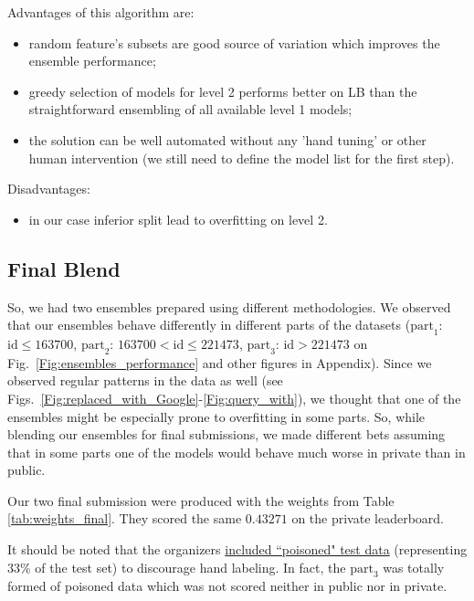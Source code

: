 \documentclass[12pt]{article}
\begin{document}
Advantages of this algorithm are:
\begin{itemize}
\item random feature's subsets are good source of variation which improves the ensemble performance;
\item greedy selection of models for level 2 performs better on LB than the straightforward ensembling of all available level 1 models;
\item the solution can be well automated without any 'hand tuning' or other human intervention (we still need to define the model list for the first step).
\end{itemize}

Disadvantages:
\begin{itemize}
\item  in our case inferior split lead to overfitting on level 2.
\end{itemize}


\subsection{Final Blend}
\label{subsec:final_blend_description}
So, we had two ensembles prepared using different methodologies. We observed that our ensembles behave differently in different parts of the datasets ($\text{part}_1$:  $\text{id} \leq 163700$,  $\text{part}_2$:  $163700<\text{id} \leq 221473$,
$\text{part}_3$:  $\text{id} > 221473$  on  Fig.~\ref{Fig:ensembles_performance}  and other figures in Appendix).  Since we observed regular patterns in the data as well (see Figs.~\ref{Fig:replaced_with_Google}-\ref{Fig:query_with}), we thought that one of the ensembles might be especially prone to overfitting in some parts. So, while blending our ensembles for final submissions, we made different bets assuming that in some parts one of the models would behave much worse in private than in public.

Our two final submission were produced with the weights from Table \ref{tab:weights_final}. They scored the same $0.43271$ on the private leaderboard.

It should be noted that the organizers  \href{https://www.kaggle.com/c/home-depot-product-search-relevance/forums/t/20491/last-20k-rows/117311}{included ``poisoned" test data} (representing $33\%$ of the test set) to discourage hand labeling. In fact, the $\text{part}_3$ was totally formed of poisoned data which was not scored neither in public nor in private.
\end{document}
